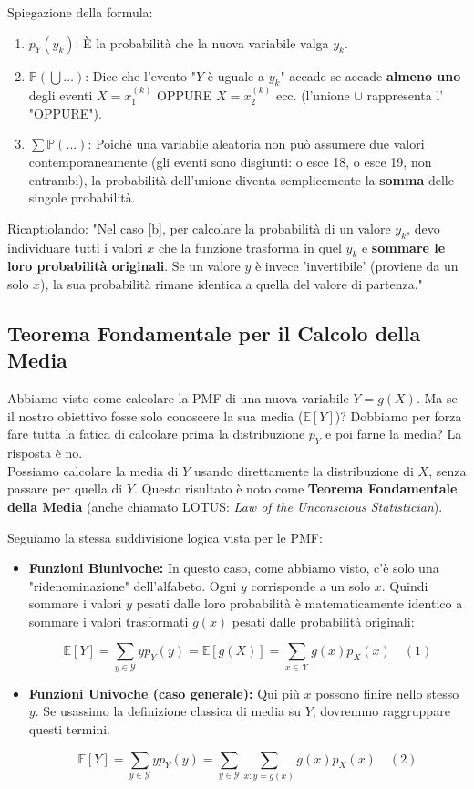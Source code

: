 Spiegazione della formula:
\begin{enumerate}
    \item $p_Y(y_k)$: È la probabilità che la nuova variabile valga $y_k$.
    \item $\mathbb{P}(\bigcup \dots)$: Dice che l'evento "$Y$ è uguale a $y_k$" accade se accade \textbf{almeno uno} degli eventi $X = x_1^{(k)}$ OPPURE $X = x_2^{(k)}$ ecc. (l'unione $\cup$ rappresenta l' "OPPURE").
    \item $\sum \mathbb{P}(\dots)$: Poiché una variabile aleatoria non può assumere due valori contemporaneamente (gli eventi sono disgiunti: o esce 18, o esce 19, non entrambi), la probabilità dell'unione diventa semplicemente la \textbf{somma} delle singole probabilità.
\end{enumerate}
Ricaptiolando:
"Nel caso [b], per calcolare la probabilità di un valore $y_k$, devo individuare tutti i valori $x$ che la funzione trasforma in quel $y_k$ e \textbf{sommare le loro probabilità originali}. Se un valore $y$ è invece 'invertibile' (proviene da un solo $x$), la sua probabilità rimane identica a quella del valore di partenza."

\subsection{Teorema Fondamentale per il Calcolo della Media}

Abbiamo visto come calcolare la PMF di una nuova variabile $Y = g(X)$. Ma se il nostro obiettivo fosse solo conoscere la sua media ($\mathbb{E}[Y]$)? Dobbiamo per forza fare tutta la fatica di calcolare prima la distribuzione $p_Y$ e poi farne la media? La risposta è no. 
\\Possiamo calcolare la media di $Y$ usando direttamente la distribuzione di $X$, senza passare per quella di $Y$. Questo risultato è noto come \textbf{Teorema Fondamentale della Media} (anche chiamato LOTUS: \textit{Law of the Unconscious Statistician}).

Seguiamo la stessa suddivisione logica vista per le PMF:

\begin{itemize}
    \item \textbf{Funzioni Biunivoche:}
    In questo caso, come abbiamo visto, c'è solo una "ridenominazione" dell'alfabeto. Ogni $y$ corrisponde a un solo $x$. Quindi sommare i valori $y$ pesati dalle loro probabilità è matematicamente identico a sommare i valori trasformati $g(x)$ pesati dalle probabilità originali:
    
    \[ \mathbb{E}[Y] = \sum_{y \in \mathcal{Y}} y p_Y(y) = \mathbb{E}[g(X)] = \sum_{x \in \mathcal{X}} g(x) p_X(x) \quad (1) \]

    \item \textbf{Funzioni Univoche (caso generale):}
    Qui più $x$ possono finire nello stesso $y$. Se usassimo la definizione classica di media su $Y$, dovremmo raggruppare questi termini.
    
    \[ \mathbb{E}[Y] = \sum_{y \in \mathcal{Y}} y p_Y(y) = \sum_{y \in \mathcal{Y}} \sum_{x: y=g(x)} g(x) p_X(x) \quad (2) \]
\end{itemize}

